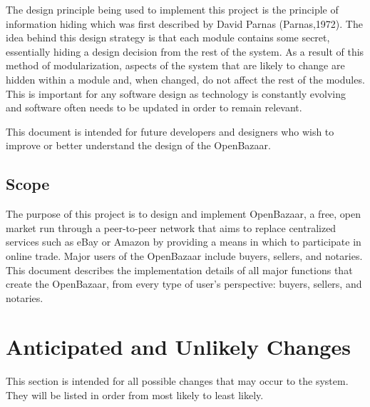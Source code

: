 \documentclass{article}
\begin{document}
The design principle being used to implement this project is the principle of information hiding which was first described by David Parnas (Parnas,1972). The idea behind this design strategy is that each module contains some secret, essentially hiding a design decision from the rest of the system. As a result of this method of modularization, aspects of the system that are likely to change are hidden within a module and, when changed, do not affect the rest of the modules. This is important for any software design as technology is constantly evolving and software often needs to be updated in order to remain relevant.

This document is intended for future developers and designers who wish to improve or better understand the design of the OpenBazaar.

\subsection{Scope}
The purpose of this project is to design and implement OpenBazaar, a free, open market run through a peer-to-peer network that aims to replace centralized services such as eBay or Amazon by providing a means in which to participate in online trade. Major users of the OpenBazaar include buyers, sellers, and notaries. This document describes the implementation details of all major functions that create the OpenBazaar, from every type of user's perspective: buyers, sellers, and notaries.


\section*{Anticipated and Unlikely Changes}
This section is intended for all possible changes that may occur to the system. They will be listed in order from most likely to least likely.
\newline
\newline
\end{document}
